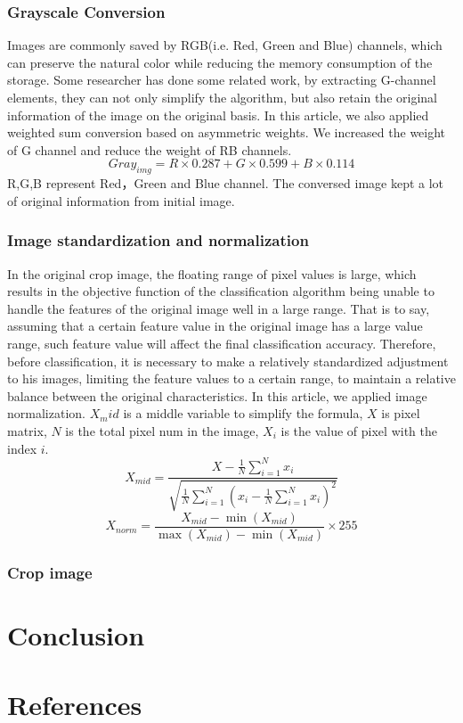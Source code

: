 \documentclass[11pt,en]{elegantpaper}
\begin{document}
\subsubsection{Grayscale Conversion}
Images are commonly saved by RGB(i.e. Red, Green and Blue) channels, which can preserve the natural color while reducing the memory consumption of the storage. Some researcher has done some related work\cite{sun2013rgb}, by extracting G-channel elements, they can not only simplify the algorithm, but also retain the original information of the image on the original basis. In this article, we also applied weighted sum conversion based on asymmetric weights. We increased the weight of G channel and reduce the weight of RB channels. 
$$Gray_{img}=R\times 0.287+G\times 0.599 + B\times 0.114$$
R,G,B represent Red，Green and Blue channel. The conversed image kept a lot of original information from initial image.

\subsubsection{Image standardization and normalization}
In the original crop image, the floating range of pixel values ​​is large, which results in the objective function of the classification algorithm being unable to handle the features of the original image well in a large range. That is to say, assuming that a certain feature value in the original image has a large value range, such feature value will affect the final classification accuracy. Therefore, before classification, it is necessary to make a relatively standardized adjustment to his images, limiting the feature values ​​to a certain range, to maintain a relative balance between the original characteristics. In this article, we applied image normalization. $X_mid$ is a middle variable to simplify the formula, $X$ is pixel matrix, $N$ is the total pixel num in the image, $X_i$ is the value of pixel with the index $i$.
$$X_{mid}=\frac{X-\frac{1}{N} \sum_{i=1}^{N} x_{i}}{\sqrt{\frac{1}{N} \sum_{i=1}^{N}\left(x_{i}-\frac{1}{N} \sum_{i=1}^{N} x_{i}\right)^{2}}}$$ 
$$X_{norm}=\frac{X_{mid}-\min \left(X_{mid}\right)}{\max \left(X_{mid}\right)-\min \left(X_{mid}\right)} \times 255$$

\subsubsection{Crop image }
\section{Conclusion}

\section{References}


\end{document}
